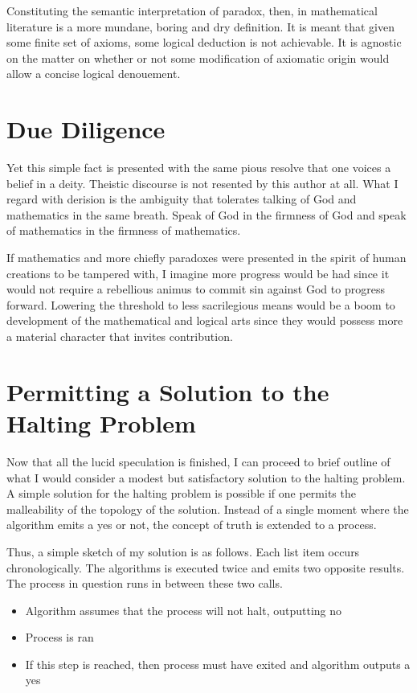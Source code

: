 \documentclass{article}
\begin{document}
	Constituting the semantic interpretation of paradox, then, in mathematical literature is a more mundane, boring and dry definition. It is meant that given some finite set of axioms, some logical deduction is not achievable. It is agnostic on the matter on whether or not some modification of axiomatic origin would allow a concise logical denouement. 
	
	\section{Due Diligence}
	
	Yet this simple fact is presented with the same pious resolve that one voices a belief in a deity. Theistic discourse is not resented by this author at all. What I regard with derision is the ambiguity that tolerates talking of God and mathematics in the same breath. Speak of God in the firmness of God and speak of mathematics in the firmness of mathematics.
	
	If mathematics and more chiefly paradoxes were presented in the spirit of human creations to be tampered with, I imagine more progress would be had since it would not require a rebellious animus to commit sin against God to progress forward. Lowering the threshold to less sacrilegious means would be a boom to development of the mathematical and logical arts since they would possess more a material character that invites contribution.
	
	\section{Permitting a Solution to the Halting Problem}
	
	Now that all the lucid speculation is finished, I can proceed to brief outline of what I would consider a modest but satisfactory solution to the halting problem. A simple solution for the halting problem is possible if one permits the malleability of the topology of the solution. Instead of a single moment where the algorithm emits a yes or not, the concept of truth is extended to a process.
	
	Thus, a simple sketch of my solution is as follows. Each list item occurs chronologically. The algorithms is executed twice and emits two opposite results. The process in question runs in between these two calls.
	\begin{itemize}
		\item Algorithm assumes that the process will not halt, outputting no
		\item Process is ran
		\item If this step is reached, then process must have exited and algorithm outputs a yes
	\end{itemize}
\end{document}
